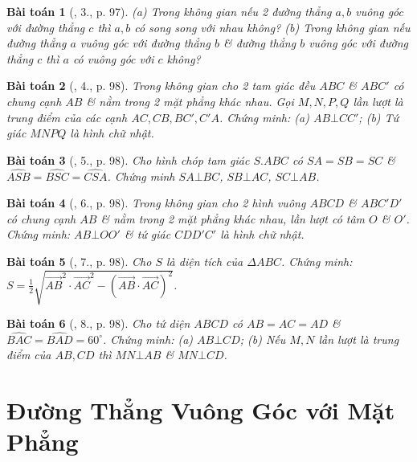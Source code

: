 \documentclass{article}
\numberwithin{equation}{section}
\newtheorem{baitoan}{Bài toán}
\begin{document}
\begin{baitoan}[\cite{SGK_Toan_11_hinh_hoc_co_ban}, 3., p. 97]
	(a) Trong không gian nếu 2 đường thẳng $a,b$ vuông góc với đường thẳng $c$ thì $a,b$ có song song với nhau không? (b) Trong không gian nếu đường thẳng $a$ vuông góc với đường thẳng $b$ \& đường thẳng $b$ vuông góc với đường thẳng $c$ thì $a$ có vuông góc với $c$ không?
\end{baitoan}

\begin{baitoan}[\cite{SGK_Toan_11_hinh_hoc_co_ban}, 4., p. 98]
	Trong không gian cho 2 tam giác đều $ABC$ \& $ABC'$ có chung cạnh $AB$ \& nằm trong 2 mặt phẳng khác nhau. Gọi $M,N,P,Q$ lần lượt là trung điểm của các cạnh $AC,CB,BC',C'A$. Chứng minh: (a) $AB\bot CC'$; (b) Tứ giác $MNPQ$ là hình chữ nhật.
\end{baitoan}

\begin{baitoan}[\cite{SGK_Toan_11_hinh_hoc_co_ban}, 5., p. 98]
	Cho hình chóp tam giác $S.ABC$ có $SA = SB = SC$ \& $\widehat{ASB} = \widehat{BSC} = \widehat{CSA}$. Chứng minh $SA\bot BC$, $SB\bot AC$, $SC\bot AB$.
\end{baitoan}

\begin{baitoan}[\cite{SGK_Toan_11_hinh_hoc_co_ban}, 6., p. 98]
	Trong không gian cho 2 hình vuông $ABCD$ \& $ABC'D'$ có chung cạnh $AB$ \& nằm trong 2 mặt phẳng khác nhau, lần lượt có tâm $O$ \& $O'$. Chứng minh: $AB\bot OO'$ \& tứ giác $CDD'C'$ là hình chữ nhật.
\end{baitoan}

\begin{baitoan}[\cite{SGK_Toan_11_hinh_hoc_co_ban}, 7., p. 98]
	Cho $S$ là diện tích của $\Delta ABC$. Chứng minh: $S = \frac{1}{2}\sqrt{\overrightarrow{AB}^2\cdot\overrightarrow{AC}^2 - (\overrightarrow{AB}\cdot\overrightarrow{AC})^2}$.
\end{baitoan}

\begin{baitoan}[\cite{SGK_Toan_11_hinh_hoc_co_ban}, 8., p. 98]
	Cho tứ diện $ABCD$ có $AB = AC = AD$ \& $\widehat{BAC} = \widehat{BAD} = 60^\circ$. Chứng minh: (a) $AB\bot CD$; (b) Nếu $M,N$ lần lượt là trung điểm của $AB,CD$ thì $MN\bot AB$ \& $MN\bot CD$.
\end{baitoan}


\section{Đường Thẳng Vuông Góc với Mặt Phẳng}
\end{document}
